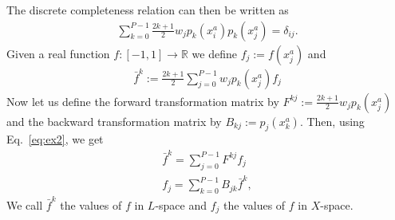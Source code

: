 The discrete completeness relation can then be written as 
\begin{align}
    \sum_{k=0}^{P-1} \frac{2k+1}{2}w_j p_k(x^a_i)p_k(x^a_j) = \delta_{ij}.
    \label{eq:completeness}
\end{align}
Given a real function $f:[-1,1]\rightarrow \mathbb{R}$ we define $f_j:=f(x^a_j)$ and
\begin{align} \label{eq:ex2}
    \bar f^k := \frac{2k+1}{2}\sum_{j=0}^{P-1}w_j p_k(x^a_j) f_j 
\end{align}
Now let us define the forward transformation matrix by $F^{kj}:=\frac{2k+1}{2}w_jp_k(x^a_j)$ and 
the backward transformation matrix by $B_{kj}:= p_j(x^a_k)$. Then, 
using Eq.~\eqref{eq:ex2}, we get
\begin{subequations}
\begin{align}
    \bar f^k = \sum_{j=0}^{P-1}F^{kj}f_j \\
    f_j = \sum_{k=0}^{P-1} B_{jk}\bar f^k,
\end{align}
\end{subequations}
We call $\bar f^k$ the values of $f$ in $L$-space and $f_j$ the values of $f$ in $X$-space.

